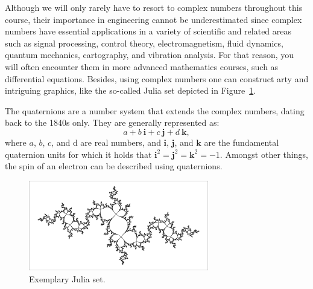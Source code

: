 \ifcourse
Although we will only rarely have to resort to complex numbers throughout this course, their importance in engineering cannot be underestimated since complex numbers have essential  applications in a variety of scientific and related areas such as signal processing, control theory, electromagnetism, fluid dynamics, quantum mechanics, cartography, and vibration analysis. For that reason, you will often encounter them in more advanced mathematics courses, such as differential equations. Besides, using complex numbers one can construct arty and intriguing graphics, like the so-called Julia set depicted in Figure~\ref{fig_sets_11}.
\fi

\ifcourse
\begin{remark}[Quaternions]
	The quaternions are a number system that extends the complex numbers, dating back to the 1840s only. They are generally represented as:
	$$
	a+b\ \mathbf {i} +c\ \mathbf {j} +d\ \mathbf {k}, 
	$$
	where $a$, $b$, $c$, and d are real numbers, and $\mathbf{i}$, $\mathbf{j}$, and $\mathbf{k}$ are the fundamental quaternion units for which it holds that $\mathbf{i}^2=\mathbf{j}^2=\mathbf{k}^2=-1$. Amongst other things, the spin of an electron can be described using quaternions. 	
\end{remark}
\fi

\ifcourse
\begin{figure}[h!]
	\begin{center}
		\includegraphics[width=0.7\textwidth]{fig_sets_11}
		\caption{Exemplary Julia set.}
		\label{fig_sets_11}
	\end{center}
\end{figure}
\fi







